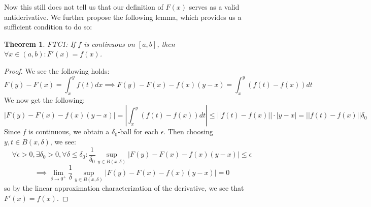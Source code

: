 \documentclass[10pt,letterpaper]{article} %
\newtheorem{thm}{Theorem}[section]
\begin{document}
Now this still does not tell us that our definition of $F(x)$ serves as a valid antiderivative. We further propose the following lemma, which provides us a sufficient condition to do so:
\begin{thm}
FTC1: If $f$ is continuous on $[a, b]$, then $\forall x \in (a, b): F'(x) = f(x)$.
\end{thm}
\begin{proof}
We see the following holds:
\begin{equation*}
  F(y) - F(x) = \int_{x}^{y}f(t)dx \implies F(y) - F(x) - f(x)(y-x) = \int_{x}^{y}(f(t)-f(x))dt
\end{equation*}
We now get the following:
\begin{equation*}
  \left|F(y) - F(x) - f(x)(y-x)\right| = \left|\int_{x}^{y}(f(t)-f(x))dt\right| \leqslant ||f(t) - f(x)|| \cdot |y-x| = ||f(t) - f(x)|| \delta_0
\end{equation*}
Since $f$ is continuous, we obtain a $\delta_0$-ball for each $\epsilon$. Then choosing $y, t \in B(x, \delta)$, we see:
\begin{equation*}
\forall \epsilon > 0, \exists \delta_0 > 0, \forall \delta \leqslant \delta_0: \frac{1}{\delta_0}\sup_{y \in B(x, \delta)}|F(y) - F(x) - f(x)(y-x)| \leqslant \epsilon
\end{equation*}
\begin{equation*}
\implies \lim_{\delta \xrightarrow{} 0^+}\frac{1}{\delta}\sup_{y \in B(x, \delta)}|F(y) - F(x) - f(x)(y-x)| = 0
\end{equation*}
so by the linear approximation characterization of the derivative, we see that $F'(x) = f(x)$.
\end{proof}
\end{document}
